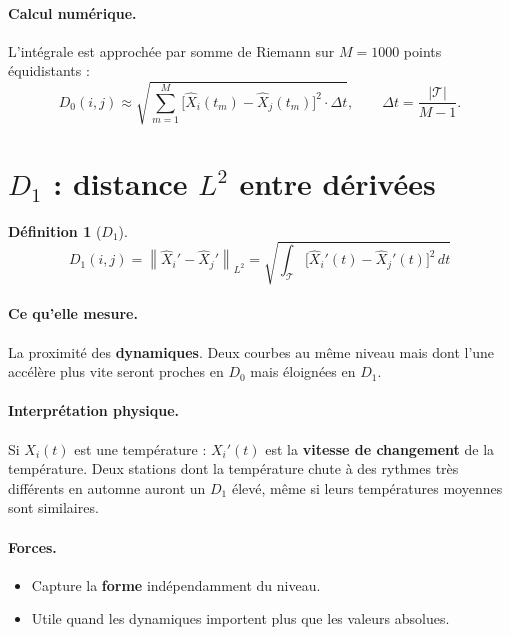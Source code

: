 \documentclass[11pt, a4paper]{article}
\theoremstyle{definition}
\newtheorem{definition}{Définition}[section]
\theoremstyle{remark}
\begin{document}
\paragraph{Calcul numérique.}
L'intégrale est approchée par somme de Riemann sur $M = 1000$ points
équidistants :
\[
  D_0(i,j) \approx \sqrt{\sum_{m=1}^{M} \bigl[\hat{X}_i(t_m) - \hat{X}_j(t_m)\bigr]^2 \cdot \Delta t}, \qquad
  \Delta t = \frac{|\mathcal{T}|}{M - 1}.
\]

\section{$D_1$ : distance $L^2$ entre dérivées}

\begin{definition}[$D_1$]
\[
  D_1(i,j) = \left\| \hat{X}_i' - \hat{X}_j' \right\|_{L^2}
  = \sqrt{\int_{\mathcal{T}} \bigl[\hat{X}_i'(t) - \hat{X}_j'(t)\bigr]^2 \, dt}
\]
\end{definition}

\paragraph{Ce qu'elle mesure.}
La proximité des \textbf{dynamiques}. Deux courbes au même niveau mais dont
l'une accélère plus vite seront proches en $D_0$ mais éloignées en $D_1$.

\paragraph{Interprétation physique.}
Si $X_i(t)$ est une température : $X_i'(t)$ est la \textbf{vitesse de
changement} de la température. Deux stations dont la température chute à des
rythmes très différents en automne auront un $D_1$ élevé, même si leurs
températures moyennes sont similaires.

\paragraph{Forces.}
\begin{itemize}[nosep]
  \item Capture la \textbf{forme} indépendamment du niveau.
  \item Utile quand les dynamiques importent plus que les valeurs absolues.
\end{itemize}
\end{document}

